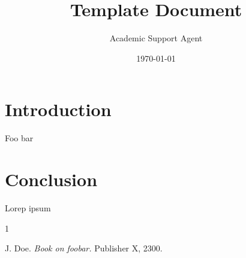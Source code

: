 \documentclass{article}
\title{Template Document}
\author{Academic Support Agent}
\date{\today}
\begin{document}
\maketitle

\maketitle

\chapter{Introduction}

Foo bar

\chapter{Conclusion}

Lorep ipsum \cite{doe}

\begin{thebibliography}{1}

 J. Doe. \emph{Book on foobar.} Publisher X,
 2300.

\end{thebibliography}
\end{document}

